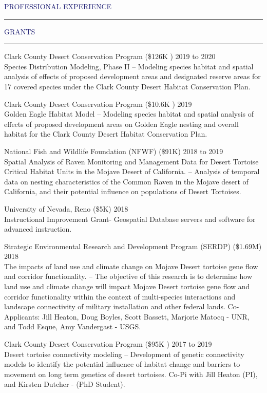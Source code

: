 \documentclass{resume} %
\renewenvironment{rSection}[1]{
\sectionskip
\textcolor{MidnightBlue}{\MakeUppercase{#1}}
\sectionlineskip
\hrule
\begin{list}{}{
\setlength{\leftmargin}{1.5em}
}
\item[]
}{
\end{list}
}
\begin{document}
\begin{rSection}{Professional Experience}
\begin{rSection}{Grants}{}
\item Clark County Desert Conservation Program (\$126K
) \hfill 2019 to 2020  \\
Species Distribution Modeling, Phase II
 -- Modeling species habitat and spatial analysis of effects of proposed development areas and designated reserve areas for 17 covered species under the Clark County Desert Habitat Conservation Plan.
 \item Clark County Desert Conservation Program (\$10.6K
) \hfill 2019\\
Golden Eagle Habitat Model
 -- Modeling species habitat and spatial analysis of effects of proposed development areas on Golden Eagle nesting and overall habitat for the Clark County Desert Habitat Conservation Plan.
 
\item National Fish and Wildlife Foundation (NFWF) (\$91K) \hfill 2018 to 2019 \\
Spatial Analysis of Raven Monitoring and Management Data for Desert Tortoise Critical Habitat Units in the Mojave Desert of California.
-- Analysis of temporal data on nesting characteristics of the Common Raven in the Mojave desert of California, and their potential influence on populations of Desert Tortoises.

\item University of Nevada, Reno (\$5K) \hfill 2018  \\
Instructional Improvement Grant- Geospatial Database servers and software for advanced instruction.

\item Strategic Environmental Research and Development Program (SERDP) (\$1.69M) \hfill 2018  \\
The impacts of land use and climate change on Mojave Desert tortoise gene flow and corridor functionality.
-- The objective of this research is to determine how land use and climate change will impact Mojave Desert tortoise gene flow and corridor functionality within the context of multi-species interactions and landscape connectivity of military installation and other federal lands. Co-Applicants: Jill Heaton, Doug Boyles, Scott Bassett, Marjorie Matocq - UNR, and Todd Esque, Amy Vandergast  - USGS.

\item Clark County Desert Conservation Program (\$95K
) \hfill 2017 to 2019  \\
Desert tortoise connectivity modeling
 -- Development of genetic connectivity models to identify the potential influence of habitat change and barriers to movement on long term genetics of desert tortoises.  Co-Pi  with Jill Heaton (PI), and Kirsten Dutcher - (PhD Student).


\end{rSection}
\end{rSection}
\end{document}
